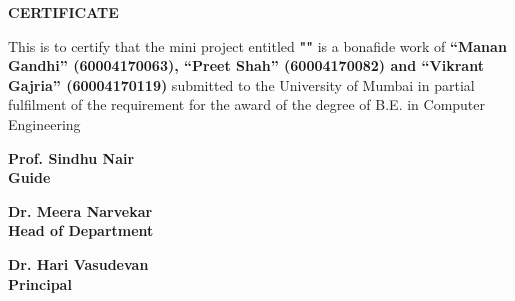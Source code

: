 \begingroup
\makeatletter

\thispagestyle{plain}
\setcounter{page}{1} 
\setlength{\parindent}{0pt}
\linespread{1.5}
\fontsize{12pt}{14pt} \selectfont

\centerline{\Huge\bf CERTIFICATE}
\vspace{4pt}

This is to certify that the mini project entitled {\bf "\@title"} is a bonafide work of {\bf “Manan Gandhi” (60004170063), “Preet Shah” (60004170082) and “Vikrant Gajria” (60004170119)} submitted to the University of Mumbai in partial fulfilment of the requirement for the award of the degree of B.E. in Computer Engineering

\vspace{2in}
\begin{center}
    \parbox{5cm}{
    \centering \bf
    Prof. Sindhu Nair \\
    Guide
    }
\end{center}

\vspace{2in}
\begin{center}
    \parbox{5cm}{
    \centering \bf
    Dr. Meera Narvekar \\
    Head of Department
    }
    \hfill
    \parbox{5cm}{
    \centering \bf
    Dr. Hari Vasudevan \\ Principal
    }
\end{center}

%
\pagebreak

\endgroup
\makeatother
